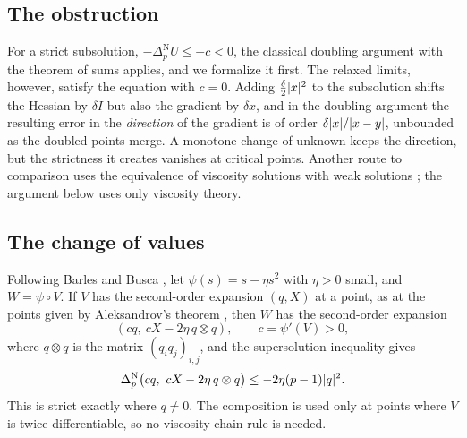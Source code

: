 \documentclass[11pt,reqno]{amsart}
\newcommand{\pnlap}{\Delta_p^{\mathrm{N}}}       %
\DeclarePairedDelimiter{\abs}{\lvert}{\rvert}
\theoremstyle{plain}
\theoremstyle{definition}
\theoremstyle{remark}
\begin{document}
\subsection{The obstruction}
For a strict subsolution, $-\pnlap U \le -c < 0$, the classical doubling
argument with the theorem of sums \cite{CIL92} applies, and we formalize it
first. The relaxed limits, however, satisfy the equation with $c = 0$.
Adding $\frac\delta2\abs x^2$ to the subsolution shifts the Hessian by
$\delta I$ but also the gradient by $\delta x$, and in the doubling argument
the resulting error in the \emph{direction} of the gradient is of order
$\delta\abs x/\abs{x - y}$, unbounded as the doubled points merge. A monotone
change of unknown keeps the direction, but the strictness it creates vanishes
at critical points. Another route to comparison uses the equivalence of
viscosity solutions with weak solutions \cite{JLM01}; the argument below uses
only viscosity theory.

\subsection{The change of values}
Following Barles and Busca \cite{BB01}, let $\psi(s) = s - \eta s^2$ with
$\eta > 0$ small, and $W = \psi\circ V$.
If $V$ has the second-order expansion $(q, X)$ at a point, as at the
points given by Aleksandrov's theorem \cite[Section~6.4]{EG15}, then $W$
has the second-order expansion
\[
  (cq,\ cX-2\eta\,q\otimes q), \qquad c=\psi'(V)>0,
\]
where
$q \otimes q$ is the matrix $(q_i q_j)_{i,j}$, and the
supersolution inequality gives
\begin{equation}\label{eq:cv}
  \pnlap\bigl(cq,\ cX - 2\eta\, q\otimes q\bigr) \le -2\eta(p-1)\abs q^2 .
\end{equation}
This is strict exactly where $q \ne 0$. The composition is used only at
points where $V$ is twice differentiable, so no viscosity chain rule is
needed.
\end{document}
